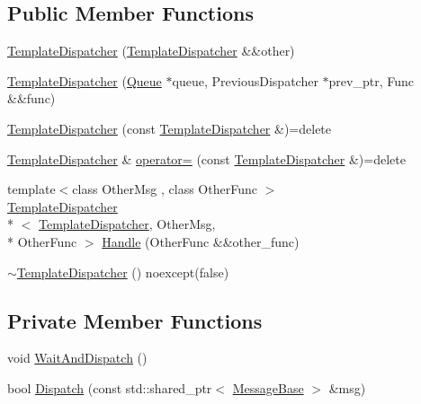 \subsection*{Public Member Functions}
\begin{DoxyCompactItemize}
\item 
\hyperlink{classmessaging_1_1TemplateDispatcher_ada53b5ba67f04fa2a8420cded172fdd1}{Template\-Dispatcher} (\hyperlink{classmessaging_1_1TemplateDispatcher}{Template\-Dispatcher} \&\&other)
\item 
\hyperlink{classmessaging_1_1TemplateDispatcher_a00aff7fdf1654ddfc2389d719b949427}{Template\-Dispatcher} (\hyperlink{classmessaging_1_1Queue}{Queue} $\ast$queue, Previous\-Dispatcher $\ast$prev\-\_\-ptr, Func \&\&func)
\item 
\hyperlink{classmessaging_1_1TemplateDispatcher_a7ef05880e531ba95632f7c7e0c78f4a3}{Template\-Dispatcher} (const \hyperlink{classmessaging_1_1TemplateDispatcher}{Template\-Dispatcher} \&)=delete
\item 
\hyperlink{classmessaging_1_1TemplateDispatcher}{Template\-Dispatcher} \& \hyperlink{classmessaging_1_1TemplateDispatcher_a5d5e246da02eb04699e03cf40a129076}{operator=} (const \hyperlink{classmessaging_1_1TemplateDispatcher}{Template\-Dispatcher} \&)=delete
\item 
{\footnotesize template$<$class Other\-Msg , class Other\-Func $>$ }\\\hyperlink{classmessaging_1_1TemplateDispatcher}{Template\-Dispatcher}\\*
$<$ \hyperlink{classmessaging_1_1TemplateDispatcher}{Template\-Dispatcher}, Other\-Msg, \\*
Other\-Func $>$ \hyperlink{classmessaging_1_1TemplateDispatcher_a06911b99af5573acede1d78ab6c4aa4f}{Handle} (Other\-Func \&\&other\-\_\-func)
\item 
\hyperlink{classmessaging_1_1TemplateDispatcher_abf090c18964d34afd84af5e03e90d9b7}{$\sim$\-Template\-Dispatcher} () noexcept(false)
\end{DoxyCompactItemize}
\subsection*{Private Member Functions}
\begin{DoxyCompactItemize}
\item 
void \hyperlink{classmessaging_1_1TemplateDispatcher_ab36064e19b91ff2ea8f37034b8de7f60}{Wait\-And\-Dispatch} ()
\item 
bool \hyperlink{classmessaging_1_1TemplateDispatcher_a0e8673cb9d39a44f0a8332885efbde8d}{Dispatch} (const std\-::shared\-\_\-ptr$<$ \hyperlink{structmessaging_1_1MessageBase}{Message\-Base} $>$ \&msg)
\end{DoxyCompactItemize}

